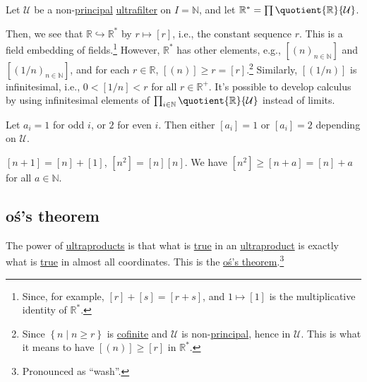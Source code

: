 \begin{eg}
	Let \(\mathcal{U} \) be a non-\hyperref[eg:principal-filter]{principal} \hyperref[def:ultrafilter]{ultrafilter} on \(I = \mathbb{N} \), and let \(\mathbb{R} ^{\ast} = \prod \quotient{\mathbb{R} }{\mathcal{U} } \).

	Then, we see that \(\mathbb{R} \hookrightarrow \mathbb{R} ^{\ast} \) by \(r \mapsto [r]\), i.e., the constant sequence \(r\). This is a field embedding of fields.\footnote{Since, for example, \([r] + [s] = [r + s]\), and \(1 \mapsto [1]\) is the multiplicative identity of \(\mathbb{R} ^{\ast} \).} However, \(\mathbb{R} ^{\ast} \) has other elements, e.g., \([(n)_{n\in \mathbb{N} }]\) and \([(1 / n)_{n\in \mathbb{N} }]\), and for each \(r\in \mathbb{R} \), \([(n)] \geq r = [r]\).\footnote{Since \(\left\{ n \mid n \geq r \right\} \) is \hyperref[def:cofinite]{cofinite} and  \(\mathcal{U} \) is non-\hyperref[eg:principal-filter]{principal}, hence in \(\mathcal{U} \). This is what it means to have \([(n)] \geq [r]\) in \(\mathbb{R} ^{\ast} \).} Similarly, \([(1 / n)]\) is infinitesimal, i.e., \(0 < [1 / n] < r\) for all \(r\in \mathbb{R} ^+\). It's possible to develop calculus by using infinitesimal elements of \(\prod_{i\in \mathbb{N} } \quotient{\mathbb{R}}{\mathcal{U} } \) instead of limits.
\end{eg}

\begin{eg}
	Let \(a_i = 1\) for odd \(i\), or \(2\) for even \(i\). Then either \([a_i] = 1\) or \([a_i] = 2\) depending on \(\mathcal{U} \).
\end{eg}

\begin{eg}
	\([n+1] = [n] + [1]\), \([n^2] = [n] [n]\). We have \([n^2] \geq [n+a] = [n] + a\) for all \(a\in \mathbb{N} \).
\end{eg}

\subsection{oś's theorem}
The power of \hyperref[def:ultraproduct]{ultraproducts} is that what is \hyperref[def:truth]{true} in an \hyperref[def:ultraproduct]{ultraproduct} is exactly what is \hyperref[def:truth]{true} in almost all coordinates. This is the \hyperref[thm:Los]{oś's theorem}.\footnote{Pronounced as ``wash''.}

